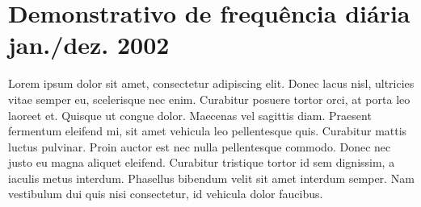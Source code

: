 {\let\clearpage\relax \chapter{\textnormal{Demonstrativo de frequência diária
	  jan./dez. 2002}}}

Lorem ipsum dolor sit amet, consectetur adipiscing elit. Donec lacus nisl,
ultricies vitae semper eu, scelerisque nec enim. Curabitur posuere tortor orci,
at porta leo laoreet et. Quisque ut congue dolor. Maecenas vel sagittis diam.
Praesent fermentum eleifend mi, sit amet vehicula leo pellentesque quis.
Curabitur mattis luctus pulvinar. Proin auctor est nec nulla pellentesque
commodo. Donec nec justo eu magna aliquet eleifend. Curabitur tristique tortor
id sem dignissim, a iaculis metus interdum. Phasellus bibendum velit sit amet
interdum semper. Nam vestibulum dui quis nisi consectetur, id vehicula dolor
faucibus. \\
